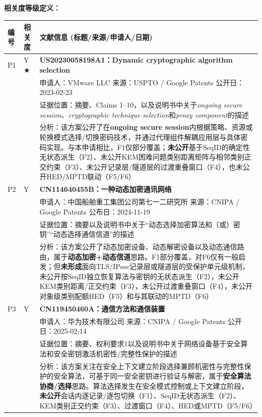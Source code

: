 ﻿\documentclass[12pt,a4paper]{article}
\newcommand{\SeqID}{\mathrm{SeqID}}
\begin{document}
\noindent\textbf{相关度等级定义：}\par
\begingroup
{}
\small
\renewcommand{\arraystretch}{1.2}
\begin{tabular}{|p{1.2cm}|p{1.8cm}|p{11.0cm}|}
\hline
\textbf{编号} & \textbf{相关度} & \textbf{文献信息 (标题/来源/申请人/日期)} \\
\hline
P1 & Y $\bigstar$ & \textbf{US20230058198A1：Dynamic cryptographic algorithm selection} \\
& & 申请人：VMware LLC \quad 来源：USPTO / Google Patents \quad 公开日：2023-02-23 \\
& & 证据位置：摘要、Claims 1--10，以及说明书中关于\textit{ongoing secure session}、\textit{cryptographic technique selection}和\textit{proxy component}的描述 \\
& & 分析：该方案公开了在\textbf{ongoing secure session}内根据策略、资源或轮换模式选择/切换密码技术，并通过代理组件解耦应用层与具体密码实现。与本申请相比，F1仅部分覆盖；\textbf{未公开}基于$\SeqID$的确定性无状态派生（F2）、未公开KEM困难问题类别距离矩阵与相邻类别正交约束（F3）、未公开记录层/隧道层的过渡重叠窗口（F4），也未公开HED/MPTD联动（F5/F6） \\
\hline
P2 & Y & \textbf{CN114640455B：一种动态加密通讯网络} \\
& & 申请人：中国船舶重工集团公司第七一二研究所 \quad 来源：CNIPA / Google Patents \quad 公布日：2024-11-19 \\
& & 证据位置：摘要以及说明书中关于“动态选择加密算法和（或）密钥”“动态选择通信信道”的描述 \\
& & 分析：该方案公开了动态加密设备、动态解密设备以及动态通信路由，属于\textbf{动态加密+动态信道}思路。F1部分覆盖，对F6仅有一般启发；但\textbf{未形成}面向TLS/IPsec记录层或隧道层的受保护单元级机制，未公开按$\SeqID$独立恢复算法与密钥的无状态派生（F2），未公开KEM类别距离/正交约束（F3），未公开过渡重叠窗口（F4），未公开对象级类别配额HED（F5）和与其联动的MPTD（F6） \\
\hline
P3 & Y & \textbf{CN119450460A：通信方法和通信装置} \\
& & 申请人：华为技术有限公司 \quad 来源：CNIPA / Google Patents \quad 公开日：2025-02-14 \\
& & 证据位置：摘要、权利要求1以及说明书中关于网络设备基于安全算法和安全密钥激活机密性/完整性保护的描述 \\
& & 分析：该方案关注在安全上下文建立阶段选择兼顾机密性与完整性保护的安全算法，可基于同一安全密钥进行验证与解密，属于\textbf{安全算法协商/选择}思路。算法选择发生在安全模式控制或上下文建立阶段，\textbf{未公开}会话内逐记录/逐包切换（F1）、$\SeqID$无状态派生（F2）、KEM类别正交约束（F3）、过渡窗口（F4）、HED或MPTD（F5/F6） \\
\hline
\end{tabular}
\endgroup
\end{document}
